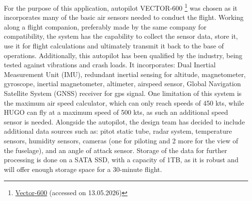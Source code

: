 For the purpose of this application, autopilot VECTOR-600 \footnote{\href{https://www.uavnavigation.com/products/autopilots/vector-600}{Vector-600} (accessed on 13.05.2026)} was chosen as it incorporates many of the basic air sensors needed to conduct the flight. Working along a flight companion, preferably made by the same company for compatibility, the system has the capability to collect the sensor data, store it, use it for flight calculations and ultimately transmit it back to the base of operations. Additionally, this autopilot has been qualified by the industry, being tested against vibrations and crash loads. It incorporates: Dual Inertial Measurement Unit (IMU), redundant inertial sensing for altitude, magnetometer, gyroscope, inertial magnetometer, altimeter, airspeed sensor, Global Navigation Satellite System (GNSS) receiver for gps signal. One limitation of this system is the maximum air speed calculator, which can only reach speeds of 450 kts, while HUGO can fly at a maximum speed of 500 kts, as such an additional speed sensor is needed. Alongside the autopilot, the design team has decided to include additional data sources such as: pitot static tube, radar system, temperature sensors, humidity sensors, cameras (one for piloting and 2 more for the view of the fuselage), and an angle of attack sensor. Storage of the data for further processing is done on a SATA SSD, with a capacity of 1TB, as it is robust and will offer enough storage space for a 30-minute flight.

